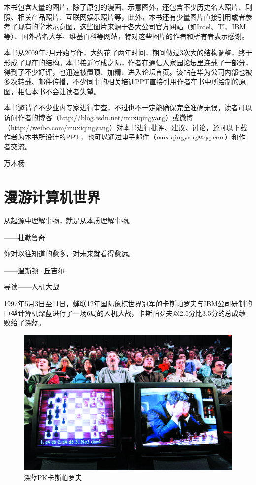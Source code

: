 \documentclass[12pt,UTF8]{ctexbook}
\begin{document}
本书包含大量的图片，除了原创的漫画、示意图外，还包含不少历史名人照片、剧照、相关产品照片、互联网娱乐照片等，此外，本书还有少量图片直接引用或者参考了现有的学术示意图，这些图片来源于各大公司官方网站（如Intel、TI、IBM等）、国外著名大学、维基百科等网站，特对这些图片的作者和所有者表示感谢。

本书从2009年7月开始写作，大约花了两年时间，期间做过3次大的结构调整，终于形成了现在的结构。本书接近写成之际，作者在通信人家园论坛里连载了一部分，得到了不少好评，也迅速被置顶、加精、进入论坛首页。该帖在华为公司内部也被多次转载、邮件传播，不少同事的相关培训PPT直接引用作者在书中所绘制的原图，相信本书不会让读者失望。

本书邀请了不少业内专家进行审查，不过也不一定能确保完全准确无误，读者可以访问作者的博客（http://blog.csdn.net/muxiqingyang）或微博（http://weibo.com/muxiqingyang）对本书进行批评、建议、讨论，还可以下载作者为本书所设计的PPT，也可以通过电子邮件（muxiqingyang@qq.com）和作者交流。

万木杨

\mainmatter

\chapter{漫游计算机世界}

从起源中理解事物，就是从本质理解事物。

——杜勒鲁奇

你对以往知道的愈多，对未来就看得愈远。

——温斯顿·丘吉尔

导读——人机大战

1997年5月3日至11日，蝉联12年国际象棋世界冠军的卡斯帕罗夫与IBM公司研制的巨型计算机深蓝进行了一场6局的人机大战，卡斯帕罗夫以2.5分比3.5分的总成绩败给了深蓝。

\begin{figure}[htbp]
	\centering
	\includegraphics[width=0.7\linewidth]{1}
	\caption{深蓝PK卡斯帕罗夫}
	\label{fig:1}
\end{figure}
\end{document}
